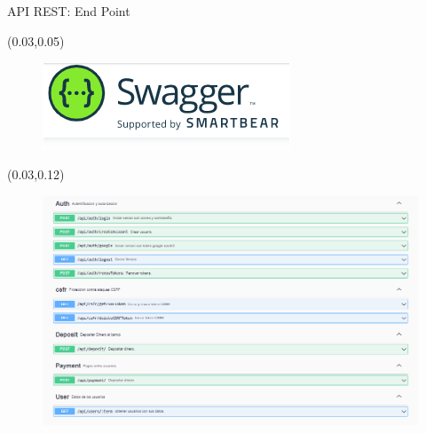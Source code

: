\documentclass[xcolor=pdftex,dvipsnames,table]{beamer}
\begin{document}
\begin{frame}{API REST: End Point}

    \begin{textblock*}{1\textwidth}(0.03\textwidth,0.05\textwidth)
        \begin{figure}
            \centering
            \includegraphics[width=0.2\linewidth]{back/sawgger1.PNG}
            \label{fig:my_label}
        \end{figure}
    \end{textblock*}
    
    \begin{textblock*}{1\textwidth}(0.03\textwidth,0.12\textwidth)
        \begin{figure}
            \centering
            \includegraphics[width=1\linewidth]{back/sawgger2.PNG}
            \label{fig:my_label}
        \end{figure}
    \end{textblock*}
\end{frame}
\end{document}
